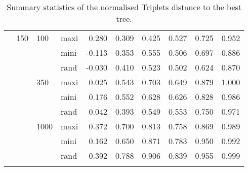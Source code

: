 \begin{longtable}{llllrrrrrr}
   & 150 & 100 & maxi & 0.280 & 0.309 & 0.425 & 0.527 & 0.725 & 0.952 \\ 
   &  &  & mini & -0.113 & 0.353 & 0.555 & 0.506 & 0.697 & 0.886 \\ 
   &  &  & rand & -0.030 & 0.410 & 0.523 & 0.502 & 0.624 & 0.870 \\ 
   &  & 350 & maxi & 0.025 & 0.543 & 0.703 & 0.649 & 0.879 & 1.000 \\ 
   &  &  & mini & 0.176 & 0.552 & 0.628 & 0.626 & 0.828 & 0.986 \\ 
   &  &  & rand & 0.042 & 0.393 & 0.549 & 0.553 & 0.750 & 0.971 \\ 
   &  & 1000 & maxi & 0.372 & 0.700 & 0.813 & 0.758 & 0.869 & 0.989 \\ 
   &  &  & mini & 0.162 & 0.650 & 0.871 & 0.783 & 0.950 & 0.992 \\ 
   &  &  & rand & 0.392 & 0.788 & 0.906 & 0.839 & 0.955 & 0.999 \\ 
   \hline
\hline
\caption{Summary statistics of the normalised Triplets distance to the best tree.} 
\label{Full_Tab_SummaryTrbest}
\end{longtable}

